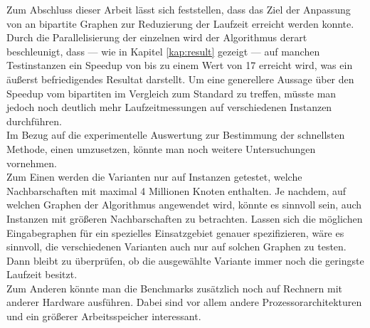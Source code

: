 



Zum Abschluss dieser Arbeit lässt sich feststellen, dass das Ziel 
der Anpassung von \gc{} an bipartite Graphen zur Reduzierung der Laufzeit erreicht werden konnte.
Durch die Parallelisierung der einzelnen  wird der Algorithmus derart beschleunigt, dass --- wie
in Kapitel \ref{kap:result} gezeigt --- auf manchen Testinstanzen ein
Speedup von bis zu einem Wert von 17 erreicht wird, was ein äußerst befriedigendes Resultat darstellt. 
Um eine generellere Aussage über den Speedup vom bipartiten \gc{} im Vergleich zum Standard  \gc{}
zu treffen, müsste man jedoch noch deutlich mehr Laufzeitmessungen auf verschiedenen Instanzen
durchführen.
\\

Im Bezug auf die experimentelle Auswertung zur Bestimmung der schnellsten Methode, 
einen \ct{} umzusetzen, könnte man noch weitere Untersuchungen vornehmen.
\\
Zum Einen werden die Varianten nur auf Instanzen getestet, welche Nachbarschaften mit 
maximal 4 Millionen Knoten enthalten. Je nachdem, auf welchen Graphen der Algorithmus angewendet wird, 
könnte es sinnvoll sein, auch Instanzen
mit größeren Nachbarschaften zu betrachten. Lassen sich die möglichen Eingabegraphen
für ein spezielles Einsatzgebiet genauer spezifizieren, wäre es sinnvoll, die verschiedenen
Varianten auch nur auf solchen Graphen zu testen. Dann bleibt zu überprüfen, ob die ausgewählte
Variante immer noch die geringste Laufzeit besitzt.
\\
Zum Anderen könnte man die Benchmarks zusätzlich noch auf Rechnern mit anderer Hardware ausführen.
Dabei sind vor allem andere Prozessorarchitekturen und ein größerer Arbeitsspeicher interessant.
